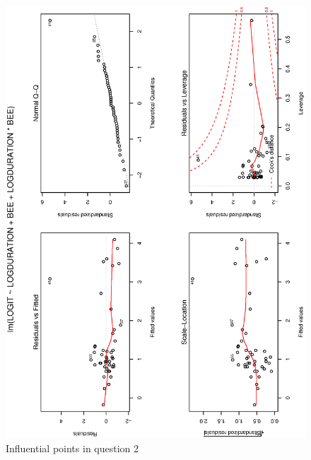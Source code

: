 \documentclass[a4paper,10pt]{article}
\begin{document}
\begin{figure}
\includegraphics[angle=-90, width=1\textwidth]{figures/math650_hw7_fig3.eps}
\caption{Influential points in question 2}\label{f3}
\end{figure}
\end{document}

